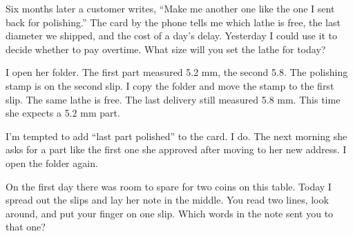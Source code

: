 Six months later a customer writes, “Make me another one like the one I sent back for polishing.” The card by the phone tells me which lathe is free, the last diameter we shipped, and the cost of a day's delay. Yesterday I could use it to decide whether to pay overtime. What size will you set the lathe for today?

I open her folder. The first part measured 5.2 mm, the second 5.8. The polishing stamp is on the second slip. I copy the folder and move the stamp to the first slip. The same lathe is free. The last delivery still measured 5.8 mm. This time she expects a 5.2 mm part.

I'm tempted to add “last part polished” to the card. I do. The next morning she asks for a part like the first one she approved after moving to her new address. I open the folder again.

On the first day there was room to spare for two coins on this table. Today I spread out the slips and lay her note in the middle. You read two lines, look around, and put your finger on one slip. Which words in the note sent you to that one?
